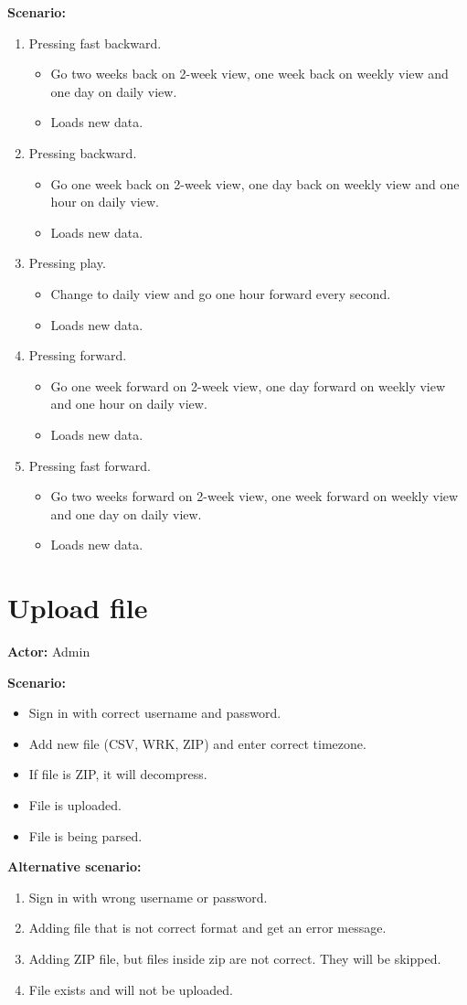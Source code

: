 \textbf{Scenario:}
\begin{enumerate}
\item Pressing fast backward.
\begin{itemize}
\item Go two weeks back on 2-week view, one week back on weekly view and one day on daily view.
\item Loads new data.
\end{itemize}
\item Pressing backward.
\begin{itemize}
\item Go one week back on 2-week view, one day back on weekly view and one hour on daily view.
\item Loads new data.
\end{itemize}
\item Pressing play.
\begin{itemize}
\item Change to daily view and go one hour forward every second.
\item Loads new data.
\end{itemize}
\item Pressing forward.
\begin{itemize}
\item Go one week forward on 2-week view, one day forward on weekly view and one hour on daily view.
\item Loads new data.
\end{itemize}
\item Pressing fast forward.
\begin{itemize}
\item Go two weeks forward on 2-week view, one week forward on weekly view and one day on daily view.
\item Loads new data.
\end{itemize}
\end{enumerate}

\section{Upload file}
\textbf{Actor:} Admin

\textbf{Scenario:}
\begin{itemize}
\item Sign in with correct username and password.
\item Add new file (CSV, WRK, ZIP) and enter correct timezone.
\item If file is ZIP, it will decompress.
\item File is uploaded.
\item File is being parsed.
\end{itemize}
\textbf{Alternative scenario:} 
\begin{enumerate}
\item Sign in with wrong username or password.
\item Adding file that is not correct format and get an error message.
\item Adding ZIP file, but files inside zip are not correct. They will be skipped.
\item File exists and will not be uploaded.
\end{enumerate}